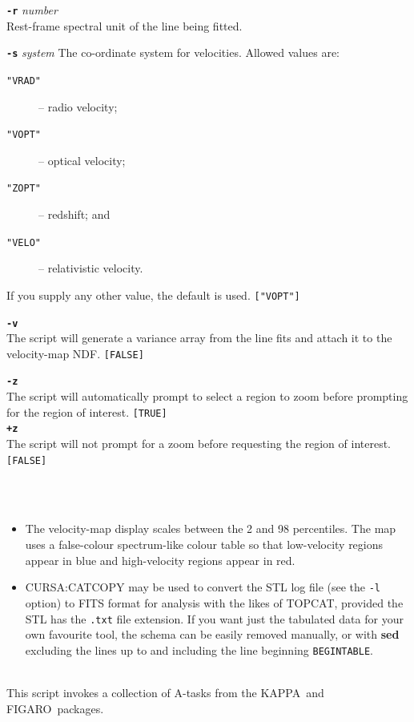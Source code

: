 \documentclass[twoside,11pt]{article}
\newcommand{\xref}[3]{#1}
\renewcommand{\_}{\texttt{\symbol{95}}}
\newcommand{\FIGARO}{{\footnotesize FIGARO}\normalsize}
\newcommand{\FIGAROref}{\xref{\FIGARO}{sun86}{}}
\newcommand{\KAPPA}{{\footnotesize KAPPA}\normalsize}
\newcommand{\KAPPAref}{\xref{\KAPPA}{sun95}{}}
\newcommand{\sstnotes}[1]{\item[Notes:] \mbox{} \\[1.3ex] #1}
\newcommand{\sstimplementationstatus}[1]{
   \item[{Implementation Status:}] \mbox{} \\[1.3ex] #1}
\newcommand{\ssthitemlist}[1]{
  \mbox{} \\
  \vspace{-8.0ex}
  \begin{itemize}
     #1
  \end{itemize}
}
\newcommand{\sstitem}{\item}
\newcommand{\sstnotes}[1]{\item[Notes:]
      \begin{description}
         #1
      \end{description}
   }
\newcommand{\sstimplementationstatus}[1]{\item[Implementation Status:]
      \begin{description}
         #1
      \end{description}
   }
\newcommand{\ssthitemlist}[1]{
      \begin{itemize}
         #1
      \end{itemize}
      \\
   }
\begin{document}
{{{         \sstitem
         {\bf{\tt{-r}}} {\em number}\\
           Rest-frame spectral unit of the line being fitted.

         \sstitem
         {\bf{\tt{-s}}} {\em system}
           The co-ordinate system for velocities.  Allowed values are:\\
           \begin{description}
           \item[{\tt "VRAD"}] -- radio velocity;
           \item[{\tt "VOPT"}] -- optical velocity;
           \item[{\tt "ZOPT"}] -- redshift; and
           \item[{\tt "VELO"}] -- relativistic velocity.
           \end{description}
           If you supply any other value, the default is used.  {\tt ["VOPT"]}

         \sstitem
         {\bf{\tt{-v}}}\\
           The script will generate a variance array from the line fits and
           attach it to the velocity-map NDF.  {\tt [FALSE]}

         \sstitem
         {\bf{\tt{-z}}}\\
           The script will automatically prompt to select a region to
           zoom before prompting for the region of interest. {\tt [TRUE]}\\
         {\bf{\tt{+z}}}\\
           The script will not prompt for a zoom before requesting the region
           of interest. {\tt [FALSE]}
      }
   }
   \sstnotes{
      \ssthitemlist{

         \sstitem
         The velocity-map display scales between the 2 and 98 percentiles.
         The map uses a false-colour spectrum-like colour table so that
         low-velocity regions appear in blue and high-velocity regions
         appear in red.

         \sstitem
         \xref{CURSA:CATCOPY}{sun190}{COPY} may be used to convert the STL
         log file (see the {\tt -l} option) to FITS format for analysis with the
         likes of \xref{TOPCAT}{sun253}{}, provided the STL has
         the {\tt .txt} file extension.  If you want just the tabulated data for
         your own favourite tool, the schema can be easily removed manually,
         or with {\bf sed} excluding the lines up to and including the line beginning
         {\tt BEGINTABLE}.

      }
   }
   \sstimplementationstatus{
      This script invokes a collection of A-tasks from the \KAPPAref\
      and \FIGAROref\ packages.
   }
}
\end{document}
